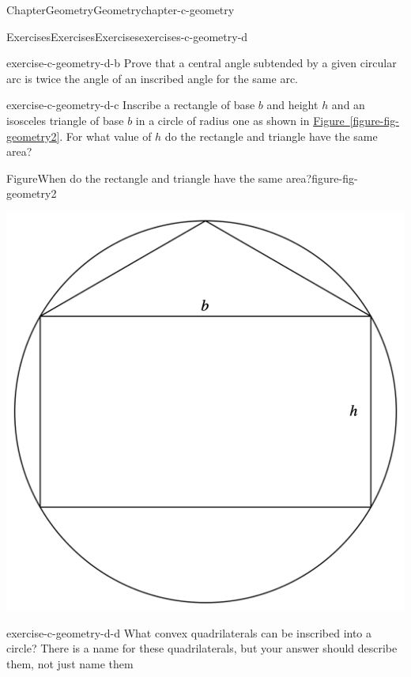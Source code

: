 \documentclass[oneside,10pt,]{book}
\newcommand{\xreffont}{\relax}
\numberwithin{equation}{section}
\begin{document}
\begin{chapterptx}{Chapter}{Geometry}{}{Geometry}{}{}{chapter-c-geometry}
%
\begin{exercises-section}{Exercises}{Exercises}{}{Exercises}{}{}{exercises-c-geometry-d}
\begin{divisionexercise}{1}{}{}{exercise-c-geometry-d-b}%
Prove that a central angle subtended by a given circular arc is twice the angle of an inscribed angle for the same arc.%
\end{divisionexercise}%
\begin{divisionexercise}{2}{}{}{exercise-c-geometry-d-c}%
Inscribe a rectangle of base \(b\) and height \(h\) and an isosceles triangle of base \(b\) in a circle of radius one as shown in \hyperref[figure-fig-geometry2]{Figure~{\xreffont\ref{figure-fig-geometry2}}}. For what value of \(h\) do the rectangle and triangle have the same area?%
\begin{figureptx}{Figure}{When do the rectangle and triangle have the same area?}{figure-fig-geometry2}{}%
\begin{image}{0.2}{0.6}{0.2}{}%
\includegraphics[width=\linewidth]{images/fig-geometry2.png}
\end{image}%
\tcblower
\end{figureptx}%
\end{divisionexercise}%
\begin{divisionexercise}{3}{}{}{exercise-c-geometry-d-d}%
What convex quadrilaterals can be inscribed into a circle? There is a name for these quadrilaterals, but your answer should describe them, not just name them%

\end{divisionexercise}
\end{exercises-section}
\end{chapterptx}
\end{document}
